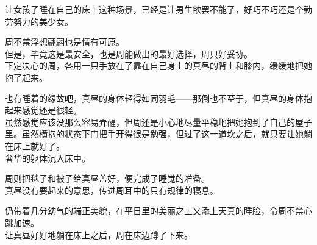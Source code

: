让女孩子睡在自己的床上这种场景，已经是让男生欲罢不能了，好巧不巧还是个勤劳努力的美少女。

周不禁浮想翩翩也是情有可原。\\

但是，毕竟这是最安全，也是周能做出的最好选择，周只好妥协。\\

下定决心的周，各用一只手放在了靠在自己身上的真昼的背上和膝内，缓缓地把她抱了起来。

也有睡着的缘故吧，真昼的身体轻得如同羽毛——那倒也不至于，但真昼的身体抱起来感觉还是很轻。\\

虽然感觉应该没那么容易弄醒，但周还是小心地尽量平稳地把她抱到了自己的屋子里。虽然横抱的状态下门把手开得很是勉强，但过了这一道坎之后，就只要让她躺在床上就好了。\\

奢华的躯体沉入床中。

周则把毯子和被子给真昼盖好，便完成了睡觉的准备。\\

真昼没有要起来的意思，传进周耳中的只有规律的寝息。

仍带着几分幼气的端正美貌，在平日里的美丽之上又添上天真的睡脸，令周不禁心跳加速。\\

让真昼好好地躺在床上之后，周在床边蹲了下来。\\

